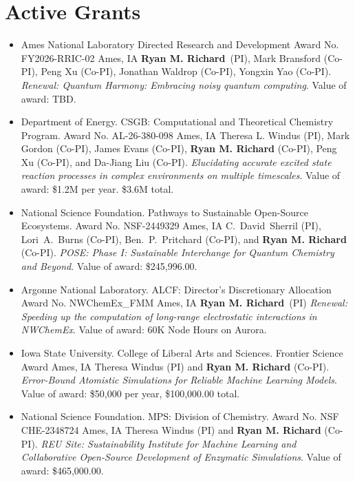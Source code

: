 \section{Active Grants}
\vspace{5pt}
\begin{itemize}
	\item{
		{Ames National Laboratory Directed Research and Development}
		{Award No. FY2026-RRIC-02}
		{Ames, IA}
		{}
		{\textbf{Ryan M. Richard}\ (PI), Mark Bransford (Co-PI), Peng Xu (Co-PI),
		         Jonathan Waldrop (Co-PI), Yongxin Yao (Co-PI). 
		 \textit{Renewal: Quantum Harmony: Embracing noisy quantum computing}.
		 Value of award: TBD. %
		}
	}
	\item{
			 {Department of Energy. 
			 CSGB: Computational and Theoretical Chemistry Program.}
			 {Award No. AL-26-380-098}
			 {Ames, IA}
	         {}
	         {Theresa L. Windus (PI), Mark Gordon (Co-PI), James Evans (Co-PI),
	           \textbf{Ryan M. Richard} (Co-PI), Peng Xu (Co-PI), and Da-Jiang 
			   Liu (Co-PI). \textit{Elucidating accurate excited state reaction 
			   processes in complex environments on multiple timescales}.
	           Value of award: \$1.2M per year. \$3.6M total.
			}
	}
	\item{
	      {National Science Foundation. Pathways to Sustainable Open-Source 
		   Ecosystems.}
		  {Award No. NSF-2449329}
		  {Ames, IA}
		  {}
		  {C.~David~Sherril (PI), Lori~A.~Burns (Co-PI), Ben.~P.~Pritchard 
		   (Co-PI), and \textbf{Ryan M. Richard} (Co-PI). \textit{POSE: Phase I: 
		   Sustainable Interchange for Quantum Chemistry and Beyond}. Value of
		   award: \$245,996.00.
		  }

	}
	\item{
		     {Argonne National Laboratory. ALCF: Director's Discretionary 
			 Allocation}
	         {Award No. NWChemEx\_FMM}
	         {Ames, IA}
	         {}
	         {\textbf{Ryan M. Richard}\ (PI) 
			  \textit{Renewal: Speeding up the computation of long-range 
			          electrostatic interactions in NWChemEx}.
	          Value of award: 60K Node Hours on Aurora.
			 }
	        
	}
	\item{
		{Iowa State University. College of Liberal Arts and Sciences.}
		{Frontier Science Award}
		{Ames, IA}
		{}
		{Theresa Windus (PI) and \textbf{Ryan M. Richard} (Co-PI). 
		 \textit{Error-Bound Atomistic Simulations for Reliable Machine 
		         Learning Models}.
		 Value of award: \$50,000 per year, \$100,000.00 total.
		}		
	}
	\item{
		{National Science Foundation. MPS: Division of Chemistry.}
		{Award No. NSF CHE-2348724}
		{Ames, IA}
		{}
		{Theresa Windus (PI) and \textbf{Ryan M. Richard} (Co-PI).
		 \textit{REU Site: Sustainability Institute for Machine Learning and
		 Collaborative Open-Source Development of Enzymatic Simulations}.
		 Value of award: \$465,000.00.
		}
		
	}
\end{itemize}

